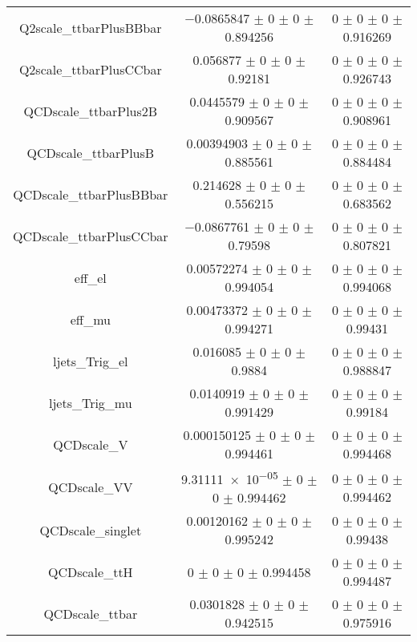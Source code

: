 \begin{table}
\begin{tabular}{ccc}
Q2scale\_ttbarPlusBBbar & \num{-0.0865847} $\pm$ \num{0} $\pm$ \num{0} $\pm$ \num{0.894256} & \num{0} $\pm$ \num{0} $\pm$ \num{0} $\pm$ \num{0.916269}\\
Q2scale\_ttbarPlusCCbar & \num{0.056877} $\pm$ \num{0} $\pm$ \num{0} $\pm$ \num{0.92181} & \num{0} $\pm$ \num{0} $\pm$ \num{0} $\pm$ \num{0.926743}\\
QCDscale\_ttbarPlus2B & \num{0.0445579} $\pm$ \num{0} $\pm$ \num{0} $\pm$ \num{0.909567} & \num{0} $\pm$ \num{0} $\pm$ \num{0} $\pm$ \num{0.908961}\\
QCDscale\_ttbarPlusB & \num{0.00394903} $\pm$ \num{0} $\pm$ \num{0} $\pm$ \num{0.885561} & \num{0} $\pm$ \num{0} $\pm$ \num{0} $\pm$ \num{0.884484}\\
QCDscale\_ttbarPlusBBbar & \num{0.214628} $\pm$ \num{0} $\pm$ \num{0} $\pm$ \num{0.556215} & \num{0} $\pm$ \num{0} $\pm$ \num{0} $\pm$ \num{0.683562}\\
QCDscale\_ttbarPlusCCbar & \num{-0.0867761} $\pm$ \num{0} $\pm$ \num{0} $\pm$ \num{0.79598} & \num{0} $\pm$ \num{0} $\pm$ \num{0} $\pm$ \num{0.807821}\\
eff\_el & \num{0.00572274} $\pm$ \num{0} $\pm$ \num{0} $\pm$ \num{0.994054} & \num{0} $\pm$ \num{0} $\pm$ \num{0} $\pm$ \num{0.994068}\\
eff\_mu & \num{0.00473372} $\pm$ \num{0} $\pm$ \num{0} $\pm$ \num{0.994271} & \num{0} $\pm$ \num{0} $\pm$ \num{0} $\pm$ \num{0.99431}\\
ljets\_Trig\_el & \num{0.016085} $\pm$ \num{0} $\pm$ \num{0} $\pm$ \num{0.9884} & \num{0} $\pm$ \num{0} $\pm$ \num{0} $\pm$ \num{0.988847}\\
ljets\_Trig\_mu & \num{0.0140919} $\pm$ \num{0} $\pm$ \num{0} $\pm$ \num{0.991429} & \num{0} $\pm$ \num{0} $\pm$ \num{0} $\pm$ \num{0.99184}\\
QCDscale\_V & \num{0.000150125} $\pm$ \num{0} $\pm$ \num{0} $\pm$ \num{0.994461} & \num{0} $\pm$ \num{0} $\pm$ \num{0} $\pm$ \num{0.994468}\\
QCDscale\_VV & \num{9.31111e-05} $\pm$ \num{0} $\pm$ \num{0} $\pm$ \num{0.994462} & \num{0} $\pm$ \num{0} $\pm$ \num{0} $\pm$ \num{0.994462}\\
QCDscale\_singlet & \num{0.00120162} $\pm$ \num{0} $\pm$ \num{0} $\pm$ \num{0.995242} & \num{0} $\pm$ \num{0} $\pm$ \num{0} $\pm$ \num{0.99438}\\
QCDscale\_ttH & \num{0} $\pm$ \num{0} $\pm$ \num{0} $\pm$ \num{0.994458} & \num{0} $\pm$ \num{0} $\pm$ \num{0} $\pm$ \num{0.994487}\\
QCDscale\_ttbar & \num{0.0301828} $\pm$ \num{0} $\pm$ \num{0} $\pm$ \num{0.942515} & \num{0} $\pm$ \num{0} $\pm$ \num{0} $\pm$ \num{0.975916}\\

\end{tabular}
\end{table}

